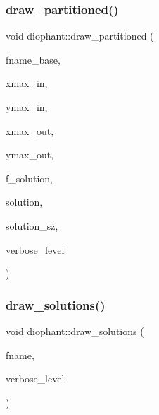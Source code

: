 \subsubsection{\texorpdfstring{draw\+\_\+partitioned()}{draw\_partitioned()}}
{\footnotesize\ttfamily void diophant\+::draw\+\_\+partitioned (\begin{DoxyParamCaption}\item[{const \mbox{\hyperlink{galois_8h_ab6cc7b4aeb6ea31aba2b3fbfc83ff5e6}{B\+Y\+TE}} $\ast$}]{fname\+\_\+base,  }\item[{\mbox{\hyperlink{galois_8h_a09fddde158a3a20bd2dcadb609de11dc}{I\+NT}}}]{xmax\+\_\+in,  }\item[{\mbox{\hyperlink{galois_8h_a09fddde158a3a20bd2dcadb609de11dc}{I\+NT}}}]{ymax\+\_\+in,  }\item[{\mbox{\hyperlink{galois_8h_a09fddde158a3a20bd2dcadb609de11dc}{I\+NT}}}]{xmax\+\_\+out,  }\item[{\mbox{\hyperlink{galois_8h_a09fddde158a3a20bd2dcadb609de11dc}{I\+NT}}}]{ymax\+\_\+out,  }\item[{\mbox{\hyperlink{galois_8h_a09fddde158a3a20bd2dcadb609de11dc}{I\+NT}}}]{f\+\_\+solution,  }\item[{\mbox{\hyperlink{galois_8h_a09fddde158a3a20bd2dcadb609de11dc}{I\+NT}} $\ast$}]{solution,  }\item[{\mbox{\hyperlink{galois_8h_a09fddde158a3a20bd2dcadb609de11dc}{I\+NT}}}]{solution\+\_\+sz,  }\item[{\mbox{\hyperlink{galois_8h_a09fddde158a3a20bd2dcadb609de11dc}{I\+NT}}}]{verbose\+\_\+level }\end{DoxyParamCaption})}

\mbox{\label{classdiophant_a8e989d6326b38c47975378c4004b3f5f}} 
\subsubsection{\texorpdfstring{draw\+\_\+solutions()}{draw\_solutions()}}
{\footnotesize\ttfamily void diophant\+::draw\+\_\+solutions (\begin{DoxyParamCaption}\item[{const \mbox{\hyperlink{galois_8h_ab6cc7b4aeb6ea31aba2b3fbfc83ff5e6}{B\+Y\+TE}} $\ast$}]{fname,  }\item[{\mbox{\hyperlink{galois_8h_a09fddde158a3a20bd2dcadb609de11dc}{I\+NT}}}]{verbose\+\_\+level }\end{DoxyParamCaption})}

